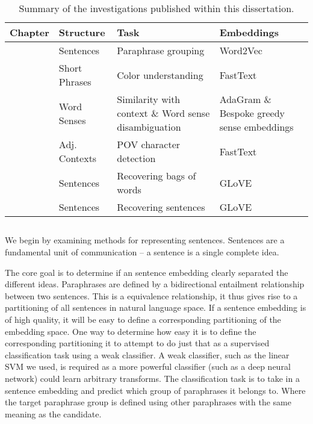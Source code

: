 \documentclass{book}
\begin{document}
\begin{table}
	\begin{tabularx}{\textwidth}{llXX}
		\toprule
		\textbf{Chapter} & \textbf{Structure} & Task & \textbf{Embeddings}\\
		\midrule
		\Cref{SentVecMeaning}  & Sentences & Paraphrase grouping &  Word2Vec \citep{mikolovSkip}\\
		\Cref{ColorEst} & Short Phrases & Color understanding & FastText \citep{bojanowski2016enriching}\\
		\Cref{RefittingSenses} & Word Senses & Similarity with context \& Word sense disambiguation %
			& AdaGram \citep{AdaGrams} \& Bespoke greedy sense embeddings\\
		\Cref{NovelPerspective} & Adj. Contexts & POV character detection & FastText \citep{bojanowski2016enriching}\\
		\Cref{BOWgen} & Sentences & Recovering bags of words & GLoVE \citep{pennington2014glove} \\
		\Cref{SOWE2Sent} & Sentences & Recovering sentences & GLoVE \citep{pennington2014glove} \\
		\bottomrule
	\end{tabularx}
	\caption{Summary of the investigations published within this dissertation.}
\end{table}

\newcommand{\detailcite}[1]{\citetitle{#1} \citep{#1}}

\subsection{ \detailcite{White2015SentVecMeaning}}
We begin by examining methods for representing sentences.
Sentences are a fundamental unit of communication --
a sentence is a single complete idea.

The core goal is to determine if an sentence embedding clearly separated the different ideas.
Paraphrases are defined by a bidirectional entailment relationship between two sentences.
This is a equivalence relationship, it thus gives rise to a partitioning of all sentences in natural language space.
If a sentence embedding is of high quality, it will be easy to define a corresponding partitioning of the embedding space.
One way to determine how easy it is to define the corresponding partitioning it to attempt to do just that as a supervised classification task using a weak classifier.
A weak classifier, such as the linear SVM we used, is required as a more powerful classifier (such as a deep neural network) could learn arbitrary transforms.
The classification task is to take in a sentence embedding and predict which group of paraphrases it belongs to.
Where the target paraphrase group is defined using other paraphrases with the same meaning as the candidate.
\end{document}
